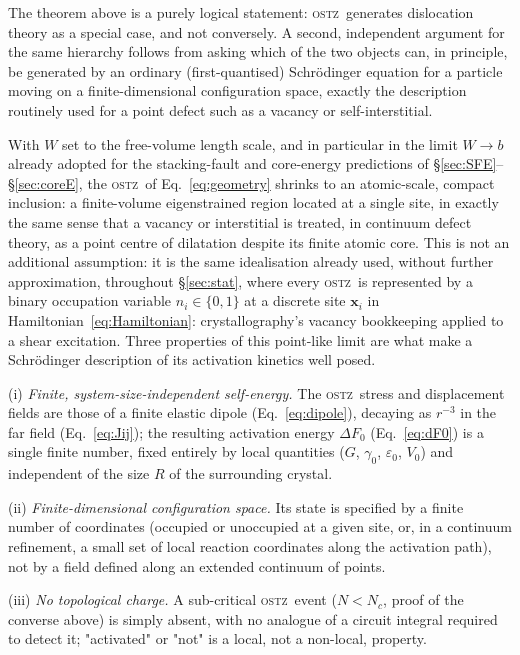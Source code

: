 \documentclass[5p,sort&compress]{elsarticle}
\newcommand{\OSTZ}{\textsc{ostz}}
\newcommand{\dF}{\Delta F_0}
\newcommand{\gz}{\gamma_0}
\begin{document}
The theorem above is a purely logical statement: \OSTZ\ generates
dislocation theory as a special case, and not conversely. A second,
independent argument for the same hierarchy follows from asking
which of the two objects can, in principle, be generated by an
ordinary (first-quantised) Schr\"odinger equation for a particle
moving on a finite-dimensional configuration space, exactly the
description routinely used for a point defect such as a vacancy or
self-interstitial.

With $W$ set to the free-volume length scale, and in particular in
the limit $W\to b$ already adopted for the stacking-fault and
core-energy predictions of \S\ref{sec:SFE}--\S\ref{sec:coreE}, the
\OSTZ\ of Eq.~\eqref{eq:geometry} shrinks to an atomic-scale,
compact inclusion: a finite-volume eigenstrained region located at a
single site, in exactly the same sense that a vacancy or
interstitial is treated, in continuum defect theory, as a point
centre of dilatation despite its finite atomic core. This is not an
additional assumption: it is the same idealisation already used,
without further approximation, throughout \S\ref{sec:stat}, where
every \OSTZ\ is represented by a binary occupation variable
$n_i\in\{0,1\}$ at a discrete site $\mathbf x_i$ in
Hamiltonian~\eqref{eq:Hamiltonian}: crystallography's vacancy
bookkeeping applied to a shear excitation. Three properties of this
point-like limit are what make a Schr\"odinger description of its
activation kinetics well posed.

(i) \emph{Finite, system-size-independent self-energy.} The \OSTZ\
stress and displacement fields are those of a finite elastic dipole
(Eq.~\eqref{eq:dipole}), decaying as $r^{-3}$ in the far field
(Eq.~\eqref{eq:Jij}); the resulting activation energy $\dF$
(Eq.~\eqref{eq:dF0}) is a single finite number, fixed entirely by
local quantities ($G$, $\gz$, $\varepsilon_0$, $V_0$) and independent
of the size $R$ of the surrounding crystal.

(ii) \emph{Finite-dimensional configuration space.} Its state is
specified by a finite number of coordinates (occupied or
unoccupied at a given site, or, in a continuum refinement, a small
set of local reaction coordinates along the activation path), not
by a field defined along an extended continuum of points.

(iii) \emph{No topological charge.} A sub-critical \OSTZ\ event
($N<N_c$, proof of the converse above) is simply absent, with no
analogue of a circuit integral required to detect it; "activated" or
"not" is a local, not a non-local, property.
\end{document}
